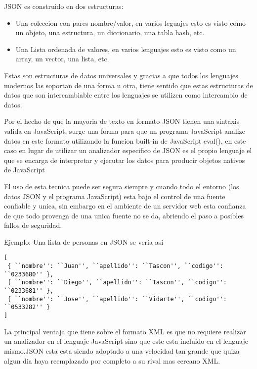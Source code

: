 JSON es construido en dos estructuras:

\begin{itemize}

	\item Una coleccion con pares nombre/valor, en varios leguajes esto es visto como un objeto, una estructura, un diccionario, una tabla hash, etc.
	
	\item Una Lista ordenada de valores, en varios lenguajes esto es visto como un array, un vector, una lista, etc.

\end{itemize}

Estas son estructuras de datos universales y gracias a que todos los lenguajes modernos las soportan de una forma u otra, tiene sentido que estas estructuras de datos que son intercambiable entre los lenguajes se utilizen como intercambio de datos.

Por el hecho de que la mayoria de texto en formato JSON tienen una sintaxis valida en JavaScript, surge una forma para que un programa JavaScript analize datos en este formato utilizando la funcion built-in de JavaScript eval(), en este caso en lugar de utilizar un analizador especifico de JSON es el propio lenguaje el que se encarga de interpretar y ejecutar los datos para producir objetos nativos de JavaScript 

El uso de esta tecnica puede ser segura siempre y cuando todo el entorno (los datos JSON y el programa JavaScript) esta bajo el control de una fuente confiable y unica, sin embargo en el ambiente de un servidor web esta confianza de que todo provenga de una unica fuente no se da, abriendo el paso a posibles fallos de seguridad.

Ejemplo: Una lista de personas en JSON se veria asi

\begin{verbatim}
[
 { ``nombre'': ``Juan'', ``apellido'': ``Tascon'', ``codigo'': ``0233680'' },
 { ``nombre'': ``Diego'', ``apellido'': ``Tascon'', ``codigo'': ``0233681'' },
 { ``nombre'': ``Jose'', ``apellido'': ``Vidarte'', ``codigo'': ``0533282'' }
]
\end{verbatim}

La principal ventaja que tiene sobre el formato XML es que no requiere realizar un analizador en el lenguaje JavaScript sino que este esta incluido en el lenguaje mismo.\newline JSON esta esta siendo adoptado a una velocidad tan grande que quiza algun dia haya reemplazado por completo a su rival mas cercano XML.


